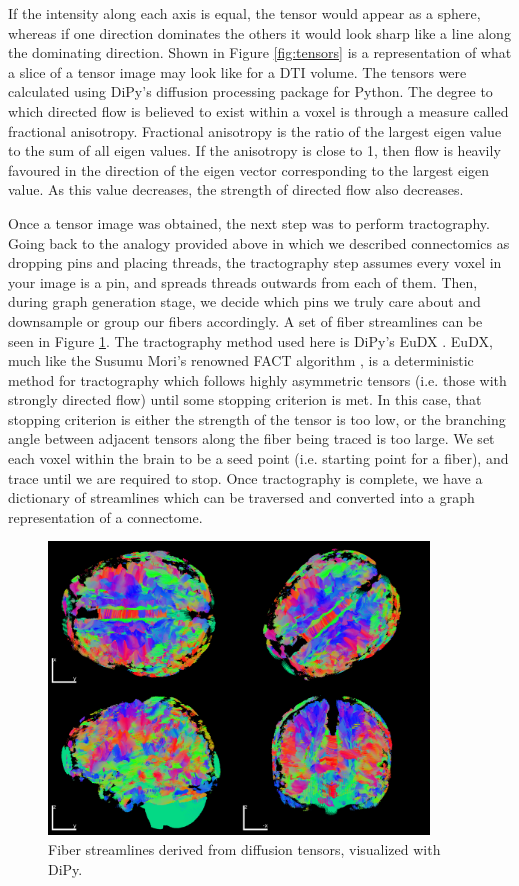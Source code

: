 If the intensity along each axis is equal, the tensor would appear as a sphere, whereas if one direction dominates the others it would look sharp like a line along the dominating direction. Shown in Figure \ref{fig:tensors} is a representation of what a slice of a tensor image may look like for a DTI volume. The tensors were calculated using DiPy's diffusion processing package for Python. The degree to which directed flow is believed to exist within a voxel is through a measure called fractional anisotropy. Fractional anisotropy is the ratio of the largest eigen value to the sum of all eigen values. If the anisotropy is close to 1, then flow is heavily favoured in the direction of the eigen vector corresponding to the largest eigen value. As this value decreases, the strength of directed flow also decreases.

Once a tensor image was obtained, the next step was to perform tractography. Going back to the analogy provided above in which we described connectomics as dropping pins and placing threads, the tractography step assumes every voxel in your image is a pin, and spreads threads outwards from each of them. Then, during graph generation stage, we decide which pins we truly care about and downsample or group our fibers accordingly. A set of fiber streamlines can be seen in Figure \ref{fig:fibers}. The tractography method used here is DiPy's EuDX \cite{eudx}. EuDX, much like the Susumu Mori's renowned FACT algorithm \cite{fact}, is a deterministic method for tractography which follows highly asymmetric tensors (i.e. those with strongly directed flow) until some stopping criterion is met. In this case, that stopping criterion is either the strength of the tensor is too low, or the branching angle between adjacent tensors along the fiber being traced is too large. We set each voxel within the brain to be a seed point (i.e. starting point for a fiber), and trace until we are required to stop. Once tractography is complete, we have a dictionary of streamlines which can be traversed and converted into a graph representation of a connectome.
\begin{figure}[h!]
\centering
\includegraphics[width=0.9\textwidth]{./figs/3dfibers.png}
\makeatletter
\let\@currsize\normalsize
\caption{Fiber streamlines derived from diffusion tensors, visualized with DiPy.}
\label{fig:fibers}
\end{figure}

